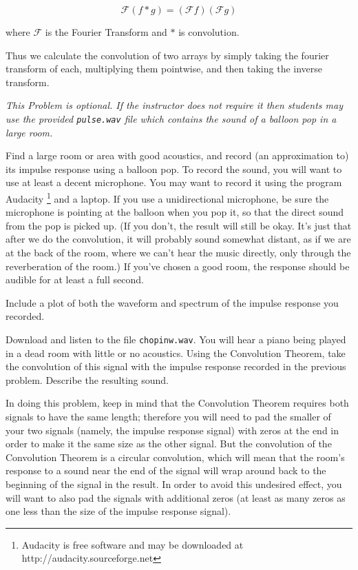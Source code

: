 \[\mathcal{F}(f \ast g) = (\mathcal{F} f) (\mathcal{F} g)\]

where $\mathcal{F}$ is the Fourier Transform and $\ast$ is convolution.

Thus we calculate the convolution of two arrays by simply taking the fourier transform of each, multiplying them pointwise, and then taking the inverse transform.

\begin{problem}
\emph{This Problem is optional.  If the instructor does not require it then students may use the provided \texttt{pulse.wav} file which contains the sound of a balloon pop in a large room.}

Find a large room or area with good acoustics, and record (an approximation to) its impulse response using a balloon pop. To record the sound, you will want to use at least a decent microphone. You may want to record it using the program Audacity \footnote{Audacity is free software and may be downloaded at http://audacity.sourceforge.net} and a laptop. If you use a unidirectional microphone, be sure the microphone is pointing at the balloon when you pop it, so that the direct sound from the pop is picked up. (If you don't, the result will still be okay. It's just that after we do the convolution, it will probably sound somewhat distant, as if we are at the back of the room, where we can't hear the music directly, only through the reverberation of the room.)
If you've chosen a good room, the response should be audible for at least a full second.

Include a plot of both the waveform and spectrum of the impulse response you recorded.
\end{problem}


\begin{problem}\label{convolution_problem}
Download and listen to the file \texttt{chopinw.wav}. You will hear a piano being played in a dead room with little or no acoustics. Using the Convolution Theorem, take the convolution of this signal with the impulse response recorded in the previous problem. Describe the resulting sound.

In doing this problem, keep in mind that the Convolution Theorem requires both signals to have the same length; therefore you will need to pad the smaller of your two signals (namely, the impulse response signal) with zeros at the end in order to make it the same size as the other signal. But the convolution of the Convolution Theorem is a circular convolution, which will mean that the room's response to a sound near the end of the signal will wrap around back to the beginning of the signal in the result. In order to avoid this undesired effect, you will want to also pad the signals with additional zeros (at least as many zeros as one less than the size of the impulse response signal).
\end{problem}

